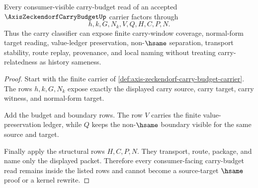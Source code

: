 \begin{theorem}
\label{thm:axis-zeckendorf-carry-budget-classifier-realization}
Every consumer-visible carry-budget read of an accepted $\AxisZeckendorfCarryBudgetUp$ carrier factors through
$$
h,k,G,N_k,V,Q,H,C,P,N.
$$
Thus the carry classifier can expose finite carry-window coverage, normal-form target reading, value-ledger preservation, non-$\hsame$ separation, transport stability, route replay, provenance, and local naming without treating carry-relatedness as history sameness.
\end{theorem}
\begin{proof}
Start with the finite carrier of \autoref{def:axis-zeckendorf-carry-budget-carrier}. The rows $h,k,G,N_k$ expose exactly the displayed carry source, carry target, carry witness, and normal-form target.

Add the budget and boundary rows. The row $V$ carries the finite value-preservation ledger, while $Q$ keeps the non-$\hsame$ boundary visible for the same source and target.

Finally apply the structural rows $H,C,P,N$. They transport, route, package, and name only the displayed packet. Therefore every consumer-facing carry-budget read remains inside the listed rows and cannot become a source-target $\hsame$ proof or a kernel rewrite.
\end{proof}

